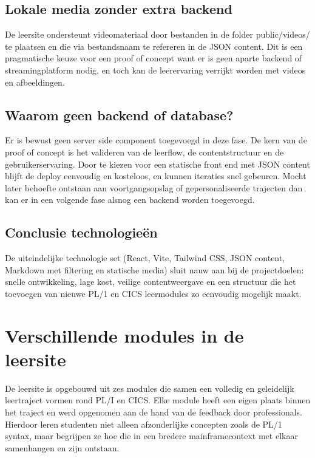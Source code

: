 \subsection{Lokale media zonder extra backend}%
\label{sec:Lokale-backend}
De leersite ondersteunt videomateriaal door bestanden in de folder public/videos/ te plaatsen en die via bestandsnaam te refereren in de JSON content.
Dit is een pragmatische keuze voor een proof of concept want er is geen aparte backend of streamingplatform nodig, en toch kan de leerervaring verrijkt worden met videos en afbeeldingen.

\subsection{Waarom geen backend of database?}%
\label{sec:backend-database}
Er is bewust geen server side component toegevoegd in deze fase.
De kern van de proof of concept is het valideren van de leerflow, de contentstructuur en de gebruikerservaring.
Door te kiezen voor een statische front end met JSON content blijft de deploy eenvoudig en kosteloos, en kunnen iteraties snel gebeuren.
Mocht later behoefte ontstaan aan voortgangsopslag of gepersonaliseerde trajecten dan kan er in een volgende fase alsnog een backend worden toegevoegd.

\subsection{Conclusie technologieën}%
\label{sec:Conclusie-technologien}
De uiteindelijke technologie set (React, Vite, Tailwind CSS, JSON content, Markdown met filtering en statische media) sluit nauw aan bij de projectdoelen:
snelle ontwikkeling, lage kost, veilige contentweergave en een structuur die het toevoegen van nieuwe PL/1 en CICS leermodules zo eenvoudig mogelijk maakt.


\section{Verschillende modules in de leersite}%
\label{sec:Modules-in-leersite}

De leersite is opgebouwd uit zes modules die samen een volledig en geleidelijk leertraject vormen rond PL/I en CICS. 
Elke module heeft een eigen plaats binnen het traject en werd opgenomen aan de hand van de feedback door professionals.
Hierdoor leren studenten niet alleen afzonderlijke concepten zoals de PL/1 syntax, maar begrijpen ze hoe die in een bredere mainframecontext met elkaar samenhangen en zijn ontstaan.

